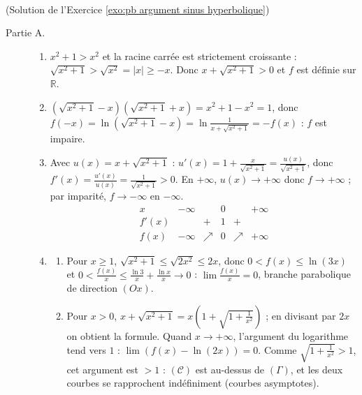 \begin{corrige}
\begin{sol} ~ \\
(Solution de l'Exercice \ref{exo:pb argument sinus hyperbolique})
\begin{description}
\item[Partie A.] \begin{enumerate}
      \item $x^2 + 1 > x^2$ et la racine carr\'ee est strictement croissante : $\sqrt{x^2 + 1} > \sqrt{x^2} = |x| \geq -x$.
            Donc $x + \sqrt{x^2 + 1} > 0$ et $f$ est d\'efinie sur $\mathbb{R}$.
      \item $\left( \sqrt{x^2+1} - x \right)\left( \sqrt{x^2+1} + x \right) = x^2 + 1 - x^2 = 1$, donc
            $f(-x) = \ln\left( \sqrt{x^2+1} - x \right) = \ln \frac{1}{x + \sqrt{x^2+1}} = -f(x)$ : $f$ est impaire.
      \item Avec $u(x) = x + \sqrt{x^2+1}$ : $u'(x) = 1 + \frac{x}{\sqrt{x^2+1}} = \frac{u(x)}{\sqrt{x^2+1}}$, donc
            $f'(x) = \frac{u'(x)}{u(x)} = \frac{1}{\sqrt{x^2+1}} > 0$.
            En $+\infty$, $u(x) \to +\infty$ donc $f \to +\infty$ ; par imparit\'e, $f \to -\infty$ en $-\infty$.
            \[
            \begin{array}{c|ccccc}
            x & -\infty & & 0 & & +\infty \\ \hline
            f'(x) & & + & 1 & + & \\ \hline
            f(x) & -\infty & \nearrow & 0 & \nearrow & +\infty
            \end{array}
            \]
      \item \begin{enumerate}
            \item Pour $x \geq 1$, $\sqrt{x^2+1} \leq \sqrt{2x^2} \leq 2x$, donc $0 < f(x) \leq \ln(3x)$ et
                  $0 < \frac{f(x)}{x} \leq \frac{\ln 3}{x} + \frac{\ln x}{x} \to 0$ : $\lim \frac{f(x)}{x} = 0$, branche parabolique de direction $(Ox)$.
            \item Pour $x > 0$, $x + \sqrt{x^2+1} = x\left( 1 + \sqrt{1 + \frac{1}{x^2}} \right)$ ; en divisant par $2x$ on obtient la formule.
                  Quand $x \to +\infty$, l'argument du logarithme tend vers $1$ : $\lim \left( f(x) - \ln(2x) \right) = 0$.
                  Comme $\sqrt{1 + \frac{1}{x^2}} > 1$, cet argument est $> 1$ : $(\mathscr{C})$ est au-dessus de $(\Gamma)$, et les deux
                  courbes se rapprochent ind\'efiniment (courbes asymptotes).

\end{enumerate}
\end{enumerate}
\end{description}
\end{sol}
\end{corrige}
